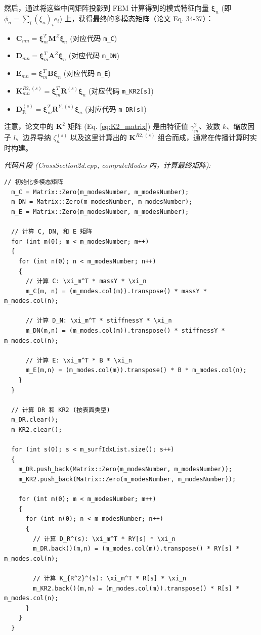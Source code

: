 \documentclass{ctexart}
\begin{document}
然后，通过将这些中间矩阵投影到 FEM 计算得到的模式特征向量 $\boldsymbol{\xi}_n$ (即 $\phi_n = \sum_i (\xi_n)_i e_i$) 上，获得最终的多模态矩阵（论文 Eq. 34-37）：

\begin{itemize}
    \item $\mathbf{C}_{mn} = \boldsymbol{\xi}_m^T \mathbf{M}^Z \boldsymbol{\xi}_n$ (对应代码 \texttt{m\_C})
    \item $\mathbf{D}_{mn} = \boldsymbol{\xi}_m^T \mathbf{A}^Z \boldsymbol{\xi}_n$ (对应代码 \texttt{m\_DN})
    \item $\mathbf{E}_{mn} = \boldsymbol{\xi}_m^T \mathbf{B} \boldsymbol{\xi}_n$ (对应代码 \texttt{m\_E})
    \item $\mathbf{K}^{R2, (s)}_{mn} = \boldsymbol{\xi}_m^T \mathbf{R}^{(s)} \boldsymbol{\xi}_n$ (对应代码 \texttt{m\_KR2[s]})
    \item $\mathbf{D}^{(s)}_{\mathrm{R}} = \boldsymbol{\xi}_m^T \mathbf{R}^{Y,(s)} \boldsymbol{\xi}_n$ (对应代码 \texttt{m\_DR[s]})
\end{itemize}
注意，论文中的 $\mathbf{K}^2$ 矩阵 (Eq. \eqref{eq:K2_matrix}) 是由特征值 $\gamma_m^2$、波数 $k$、缩放因子 $l$、边界导纳 $\zeta_n^{(s)}$ 以及这里计算出的 $\mathbf{K}^{R2, (s)}$ 组合而成，通常在传播计算时实时构建。

\textit{代码片段 (CrossSection2d.cpp, computeModes 内，计算最终矩阵):}
\begin{lstlisting}[caption={计算最终的多模态矩阵}, label={lst:final_matrices}]
  // 初始化多模态矩阵
  m_C = Matrix::Zero(m_modesNumber, m_modesNumber);
  m_DN = Matrix::Zero(m_modesNumber, m_modesNumber);
  m_E = Matrix::Zero(m_modesNumber, m_modesNumber);
  
  // 计算 C, DN, 和 E 矩阵
  for (int m(0); m < m_modesNumber; m++)
  {
    for (int n(0); n < m_modesNumber; n++)
    {
      // 计算 C: \xi_m^T * massY * \xi_n
      m_C(m, n) = (m_modes.col(m)).transpose() * massY * m_modes.col(n);
      
      // 计算 D_N: \xi_m^T * stiffnessY * \xi_n
      m_DN(m,n) = (m_modes.col(m)).transpose() * stiffnessY * m_modes.col(n);
      
      // 计算 E: \xi_m^T * B * \xi_n
      m_E(m,n) = (m_modes.col(m)).transpose() * B * m_modes.col(n);
    }
  }

  // 计算 DR 和 KR2 (按表面类型)
  m_DR.clear();
  m_KR2.clear();
  
  for (int s(0); s < m_surfIdxList.size(); s++)
  {
    m_DR.push_back(Matrix::Zero(m_modesNumber, m_modesNumber));
    m_KR2.push_back(Matrix::Zero(m_modesNumber, m_modesNumber));
    
    for (int m(0); m < m_modesNumber; m++)
    {
      for (int n(0); n < m_modesNumber; n++)
      {
        // 计算 D_R^(s): \xi_m^T * RY[s] * \xi_n
        m_DR.back()(m,n) = (m_modes.col(m)).transpose() * RY[s] * m_modes.col(n);
        
        // 计算 K_{R^2}^(s): \xi_m^T * R[s] * \xi_n
        m_KR2.back()(m,n) = (m_modes.col(m)).transpose() * R[s] * m_modes.col(n);
      }
    }
  }
\end{lstlisting}
\end{document}

